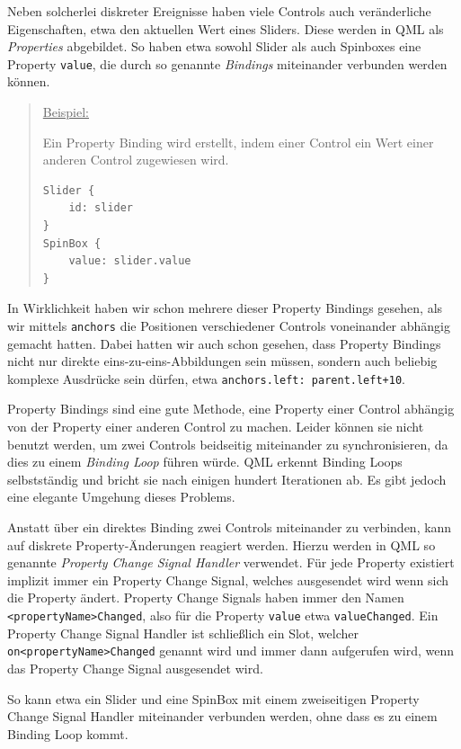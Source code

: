 \documentclass[a4paper]{article}
\begin{document}
Neben solcherlei diskreter Ereignisse haben viele Controls auch veränderliche Eigenschaften, etwa den aktuellen Wert eines Sliders. Diese werden in QML als \emph{Properties} abgebildet. So haben etwa sowohl Slider als auch Spinboxes eine Property \verb~value~, die durch so genannte \emph{Bindings} miteinander verbunden werden können.

\begin{quote}
\uline{Beispiel:}

Ein Property Binding wird erstellt, indem einer Control ein Wert einer anderen Control zugewiesen wird.

\begin{verbatim}
Slider {
    id: slider
}
SpinBox {
    value: slider.value
}
\end{verbatim}
\end{quote}

In Wirklichkeit haben wir schon mehrere dieser Property Bindings gesehen, als wir mittels \verb~anchors~ die Positionen verschiedener Controls voneinander abhängig gemacht hatten. Dabei hatten wir auch schon gesehen, dass Property Bindings nicht nur direkte eins-zu-eins-Abbildungen sein müssen, sondern auch beliebig komplexe Ausdrücke sein dürfen, etwa \verb~anchors.left: parent.left+10~.

Property Bindings sind eine gute Methode, eine Property einer Control abhängig von der Property einer anderen Control zu machen. Leider können sie nicht benutzt werden, um zwei Controls beidseitig miteinander zu synchronisieren, da dies zu einem \emph{Binding Loop} führen würde. QML erkennt Binding Loops selbstständig und bricht sie nach einigen hundert Iterationen ab. Es gibt jedoch eine elegante Umgehung dieses Problems.

Anstatt über ein direktes Binding zwei Controls miteinander zu verbinden, kann auf diskrete Property-Änderungen reagiert werden. Hierzu werden in QML so genannte \emph{Property Change Signal Handler} verwendet. Für jede Property existiert implizit immer ein Property Change Signal, welches ausgesendet wird wenn sich die Property ändert. Property Change Signals haben immer den Namen \verb~<propertyName>Changed~, also für die Property \verb~value~ etwa \verb~valueChanged~. Ein Property Change Signal Handler ist schließlich ein Slot, welcher \verb~on<propertyName>Changed~ genannt wird und immer dann aufgerufen wird, wenn das Property Change Signal ausgesendet wird.

So kann etwa ein Slider und eine SpinBox mit einem zweiseitigen Property Change Signal Handler miteinander verbunden werden, ohne dass es zu einem Binding Loop kommt.
\end{document}
